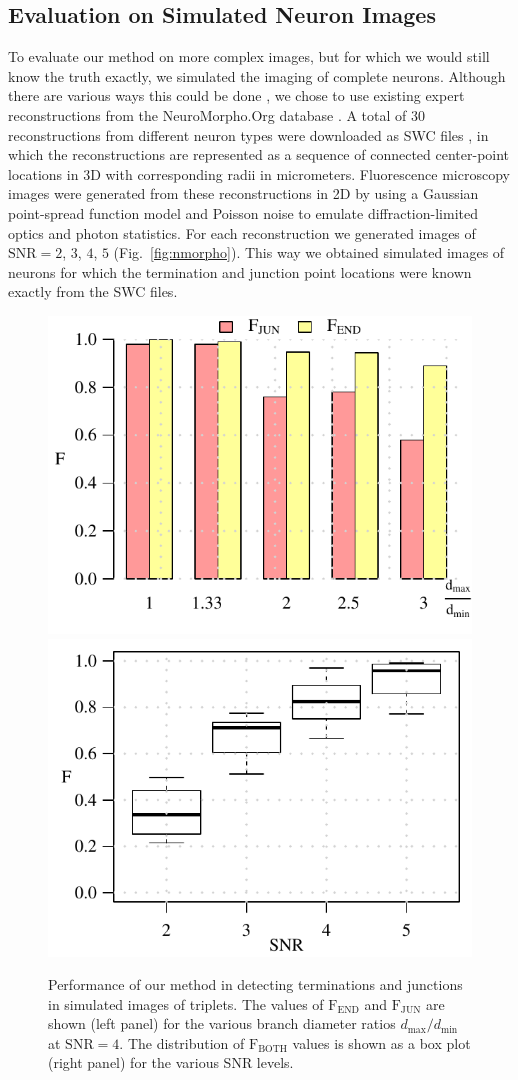 \subsection{Evaluation on Simulated Neuron Images}
\label{subsec:experiments-simulated}
To evaluate our method on more complex images, but for which we would still know the truth exactly, we simulated the imaging of complete neurons. Although there are various ways this could be done \cite{koene2009netmorph, vasilkoski2009detection}, we chose to use existing expert reconstructions from the NeuroMorpho.Org database \cite{ascoli2007neuromorpho}. A total of 30 reconstructions from different neuron types were downloaded as SWC files \cite{cannon1998line}, in which the reconstructions are represented as a sequence of connected center-point locations in 3D with corresponding radii in micrometers. Fluorescence microscopy images were generated from these reconstructions in 2D by using a Gaussian point-spread function model and Poisson noise to emulate diffraction-limited optics and photon statistics. For each reconstruction we generated images of $\textrm{SNR}=2$, $3$, $4$, $5$ (Fig.~\ref{fig:nmorpho}). This way we obtained simulated images of neurons for which the termination and junction point locations were known exactly from the SWC files.

\begin{figure}[!t]
	\centering
	\includegraphics[width=0.48\linewidth]{triplets_fjun_fend_vs_pratio}\hfill
	\includegraphics[width=0.48\linewidth]{triplets_fboth_vs_snr}
	\caption{Performance of our method in detecting terminations and junctions in simulated images of triplets. The values of $\textrm{F}_{\textrm{END}}$ and $\textrm{F}_{\textrm{JUN}}$ are shown (left panel) for the various branch diameter ratios $d_{\max}/d_{\min}$ at $\textrm{SNR}=4$. The distribution of $\textrm{F}_{\textrm{BOTH}}$ values is shown as a box plot (right panel) for the various SNR levels.}
	\label{fig:results-triplets}
\end{figure}


